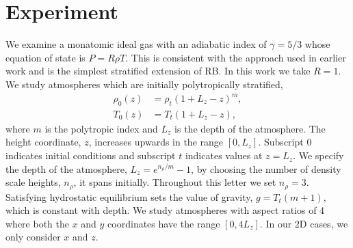 \documentclass[aps, prl, twocolumn, nofootinbib, groupedaddress, amsfonts, amssymb, amsmath]{revtex4-1}
\begin{document}
\section{Experiment} 
\label{sec:experiment}
We examine a monatomic ideal gas with an adiabatic index of
$\gamma = 5/3$ whose equation of state is $P = R\rho T$. This is consistent with the approach used in earlier work \cite{graham1975, chan&all1982,
hurlburt&all1984, cattaneo&all1990, cattaneo&all1991, brummell&all1996} 
and is the simplest stratified extension of RB.
In this work we take $R = 1$.
We study atmospheres which are initially polytropically stratified,
\begin{equation}
\begin{split}
\rho_0(z) &= \rho_{t}(1 + L_z - z)^m, \\
T_0(z)    &= T_{t}(1 + L_z - z),
\label{eqn:polytrope}
\end{split}
\end{equation}
where $m$ is the polytropic index and $L_z$ is the depth of the atmosphere.
The height coordinate, $z$, increases upwards in the range $[0, L_z]$.
Subscript 0 indicates initial conditions and subscript $t$ indicates values
at $z = L_z$.   We
specify the depth of the atmosphere, $L_z = e^{n_{\rho}/m} - 1$, by choosing
the number of density scale heights, $n_{\rho}$, it spans initially.
Throughout this letter we set $n_{\rho} = 3$.  Satisfying hydrostatic
equilibrium sets the value of gravity, $g = T_t (m + 1)$, which is
constant with depth.  We study atmospheres with aspect
ratios of 4 where both the $x$ and $y$ coordinates have the range $[0, 4L_z]$.
In our 2D cases, we only consider $x$ and $z$.
\end{document}
